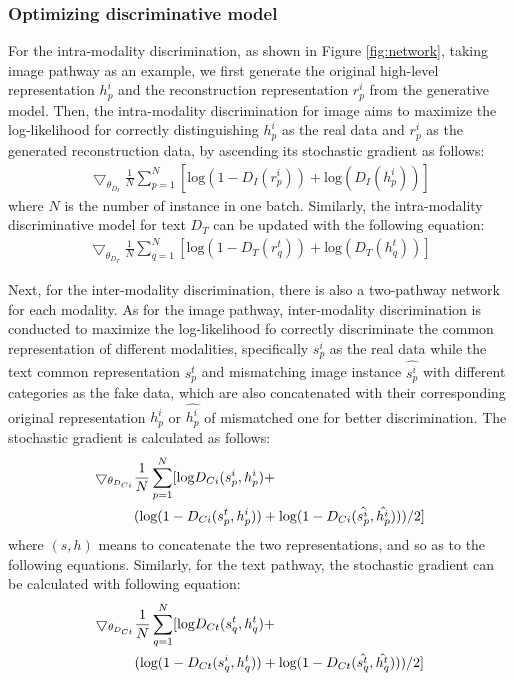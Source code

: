 \documentclass[journal]{IEEEtran}
\begin{document}
\subsubsection{\textbf{Optimizing discriminative model}}

For the intra-modality discrimination, as shown in Figure \ref{fig:network}, taking image pathway as an example, we first generate the original high-level representation $h_p^i$ and the reconstruction representation $r_p^i$ from the generative model. Then, the intra-modality discrimination for image aims to maximize the log-likelihood for correctly distinguishing $h_p^i$ as the real data and $r_p^i$ as the generated reconstruction data, by ascending its stochastic gradient as follows:
\begin{align}
\bigtriangledown _{\theta_{D_I}}\frac{1}{N} \sum_{p=1}^{N}[\textrm{log}(1-D_I(r_p^i))+\textrm{log}(D_I(h_p^i))]
\label{equ_gradient_di}
\end{align}
where $N$ is the number of instance in one batch. Similarly, the intra-modality discriminative model for text $D_T$ can be updated with the following equation:
\begin{align}
\bigtriangledown _{\theta_{D_T}}\frac{1}{N} \sum_{q=1}^{N}[\textrm{log}(1-D_T(r_q^t))+\textrm{log}(D_T(h_q^t))]
\label{equ_gradient_dt}
\end{align}

Next, for the inter-modality discrimination, there is also a two-pathway network for each modality. As for the image pathway, inter-modality discrimination is conducted to maximize the log-likelihood fo correctly discriminate the common representation of different modalities, specifically $s_p^i$ as the real data while the text common representation $s_p^t$ and mismatching image instance $\hat{s_p^i}$ with different categories as the fake data, which are also concatenated with their corresponding original representation $h_p^i$ or $\hat{h_p^i}$ of mismatched one for better discrimination. The stochastic gradient is calculated as follows:
\begin{align}
\label{equ_gradient_dc1}
\bigtriangledown _{\theta_{D_{Ci}}}&\frac{1}{N} \sum_{p=1}^{N}[\textrm{log}D_{Ci}(s_p^i,h_p^i)+ \\
&(\textrm{log}(1-D_{Ci}(s_p^t,h_p^i))+\textrm{log}(1-D_{Ci}(\hat{s_p^i},\hat{h_p^i})))/2] \notag
\end{align}
where $(s,h)$ means to concatenate the two representations, and so as to the following equations. Similarly, for the text pathway, the stochastic gradient can be calculated with following equation:
\begin{align}
\label{equ_gradient_dc2}
\bigtriangledown _{\theta_{D_{Ct}}}&\frac{1}{N} \sum_{q=1}^{N}[\textrm{log}D_{Ct}(s_q^t,h_q^t)+ \\
&(\textrm{log}(1-D_{Ct}(s_q^i,h_q^t))+\textrm{log}(1-D_{Ct}(\hat{s_q^t},\hat{h_q^t})))/2] \notag
\end{align}
\end{document}

